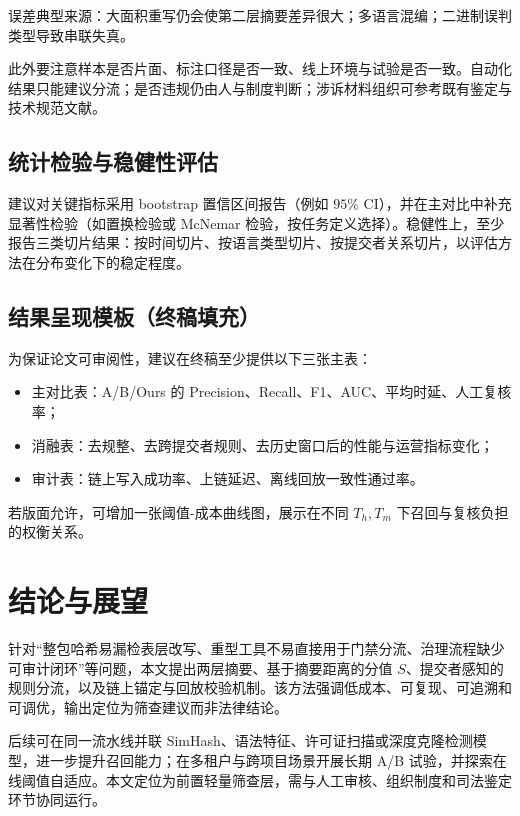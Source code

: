 \documentclass[UTF8,a4paper,zihao=5]{ctexart}
\begin{document}
误差典型来源：大面积重写仍会使第二层摘要差异很大；多语言混编；二进制误判类型导致串联失真。

此外要注意样本是否片面、标注口径是否一致、线上环境与试验是否一致。自动化结果只能建议分流；是否违规仍由人与制度判断；涉诉材料组织可参考既有鉴定与技术规范文献\cite{sft01582023,spcCase2021,spcGame2023}。

\subsection{统计检验与稳健性评估}
建议对关键指标采用 bootstrap 置信区间报告（例如 $95\%$ CI），并在主对比中补充显著性检验（如置换检验或 McNemar 检验，按任务定义选择）。稳健性上，至少报告三类切片结果：按时间切片、按语言类型切片、按提交者关系切片，以评估方法在分布变化下的稳定程度。

\subsection{结果呈现模板（终稿填充）}
为保证论文可审阅性，建议在终稿至少提供以下三张主表：
\begin{itemize}[leftmargin=2em]
  \item 主对比表：A/B/Ours 的 Precision、Recall、F1、AUC、平均时延、人工复核率；
  \item 消融表：去规整、去跨提交者规则、去历史窗口后的性能与运营指标变化；
  \item 审计表：链上写入成功率、上链延迟、离线回放一致性通过率。
\end{itemize}
若版面允许，可增加一张阈值-成本曲线图，展示在不同 $T_h,T_m$ 下召回与复核负担的权衡关系。

\section{结论与展望}
\label{sec:conclusion}

针对“整包哈希易漏检表层改写、重型工具不易直接用于门禁分流、治理流程缺少可审计闭环”等问题，本文提出两层摘要、基于摘要距离的分值 $S$、提交者感知的规则分流，以及链上锚定与回放校验机制。该方法强调低成本、可复现、可追溯和可调优，输出定位为筛查建议而非法律结论。

后续可在同一流水线并联 SimHash、语法特征、许可证扫描或深度克隆检测模型，进一步提升召回能力；在多租户与跨项目场景开展长期 A/B 试验，并探索在线阈值自适应。本文定位为前置轻量筛查层，需与人工审核、组织制度和司法鉴定环节协同运行。
\end{document}
